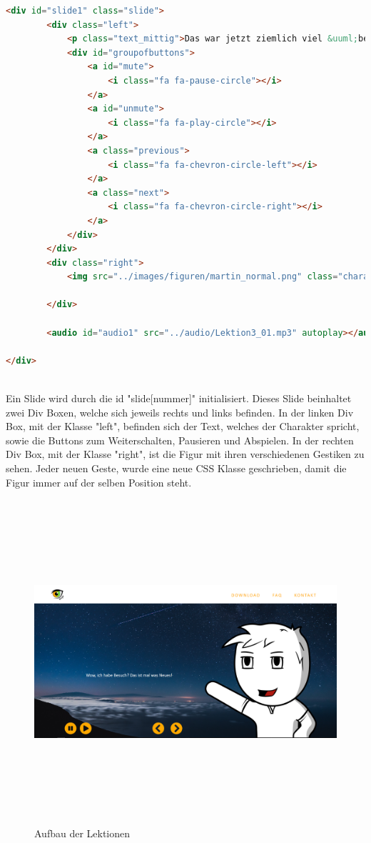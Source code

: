 \begin{lstlisting}[language=HTML, basicstyle=\scriptsize]
 <div id="slide1" class="slide">
        <div class="left">
            <p class="text_mittig">Das war jetzt ziemlich viel &uuml;ber die HTL. Aber, du bist doch wegen der Medientechnik hier. Also, plaudern wir &uuml;ber die Medientechnik! </p>
	        <div id="groupofbuttons">
		        <a id="mute">
		        	<i class="fa fa-pause-circle"></i>
		        </a>
		        <a id="unmute">
		        	<i class="fa fa-play-circle"></i>
		        </a>
		        <a class="previous">
		        	<i class="fa fa-chevron-circle-left"></i>
		        </a>
		        <a class="next">
		        	<i class="fa fa-chevron-circle-right"></i>
		        </a>
	        </div>
        </div>
        <div class="right">
            <img src="../images/figuren/martin_normal.png" class="charakter">

        </div>

        <audio id="audio1" src="../audio/Lektion3_01.mp3" autoplay></audio>

</div>
\end{lstlisting}
 \leavevmode \\
Ein Slide wird durch die id "slide[nummer]" initialisiert. Dieses Slide beinhaltet zwei Div Boxen, welche sich jeweils rechts und links befinden. In der linken Div Box, mit der Klasse "left", befinden sich der Text, welches der Charakter spricht, sowie die Buttons zum Weiterschalten, Pausieren und Abspielen. In der rechten Div Box, mit der Klasse "right", ist die Figur mit ihren verschiedenen Gestiken zu sehen. Jeder neuen Geste, wurde eine neue CSS Klasse geschrieben, damit die Figur immer auf der selben Position steht.
\begin{figure}[h]
	\centering				\includegraphics[width=12cm,height=12cm,keepaspectratio]{webseite_abb9} \leavevmode \newline 
	\caption{Aufbau der Lektionen}
	\label{AufbauLektionen}
\end{figure} \leavevmode \newline
